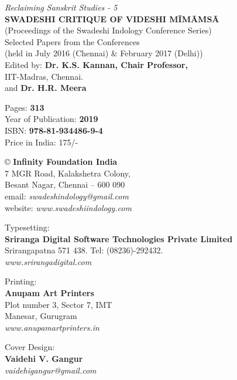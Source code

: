 \thispagestyle{empty}

\textit{Reclaiming Sanskrit Studies - 5}\\\textbf{SWADESHI CRITIQUE OF VIDESHI MĪMĀṀSĀ}\\ (Proceedings of the Swadeshi Indology Conference Series)\\ Selected Papers from the Conferences\\ (held in July 2016 (Chennai) \& February 2017 (Delhi))\\ Edited by: \textbf{Dr. K.S. Kannan, Chair Professor,}\\ IIT-Madras, Chennai.\\ and \textbf{Dr. H.R. Meera}

Pages: \textbf{313}\\ Year of Publication: \textbf{2019}\\ ISBN: \textbf{978-81-934486-9-4}\\ Price in India: 175/-

© \textbf{Infinity Foundation India}\\ 7 MGR Road, Kalakshetra Colony,\\ Besant Nagar, Chennai -- 600 090\\ email: \textit{swadeshindology@gmail.com}\\ website: \textit{www.swadeshiindology.com}

Typesetting:\\\textbf{Sriranga Digital Software Technologies Private Limited}\\ Srirangapatna 571 438. Tel: (08236)-292432.\\\textit{www.srirangadigital.com}

Printing:\\\textbf{Anupam Art Printers}\\ Plot number 3, Sector 7, IMT\\ Manesar, Gurugram\\\textit{www.anupamartprinters.in}

Cover Design:\\\textbf{Vaidehi V. Gangur}\\\textit{vaidehigangur@gmail.com}

